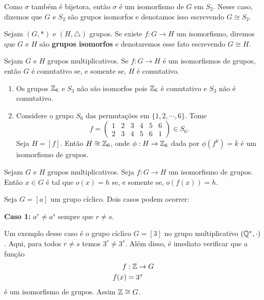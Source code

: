 \vspace{.3cm}

Como $\sigma$ também é bijetora, então $\sigma$ é um isomorfismo de $G$ em $S_2$. Nesse caso, dizemos que $G$ e $S_2$ são grupos isomorfos e denotamos isso escrevendo $G \cong S_2$.

\begin{definicao}
    Sejam $(G, *)$ e $(H, \triangle)$ grupos. Se existe $f : G \to H$ um isomorfismo, diremos que $G$ e $H$ são \textbf{grupos isomorfos} e denotaremos esse fato escrevendo $G \cong H$.
\end{definicao}

\begin{proposicao}
    Sejam $G$ e $H$ grupos multiplicativos. Se $f : G \to H$ é um isomorfismos de grupos, então $G$ é comutativo se, e somente se, $H$ é comutativo.
\end{proposicao}

\begin{exemplos}
    \begin{enumerate}[label={\arabic*})]
        \item Os grupos $\mathbb{Z}_6$ e $S_3$ não são isomorfos pois $\mathbb{Z}_6$ é comutativo e $S_3$ não é comutativo.

        \item Considere o grupo $S_6$ das permutações em $\{1, 2, \cdots, 6\}$. Tome
        \[
            f = \begin{pmatrix}
                1 & 2 & 3 & 4 & 5 & 6\\
                2 & 3 & 4 & 5 & 6 & 1
            \end{pmatrix} \in S_6.
        \]
        Seja $H = [f]$. Então $H \cong \mathbb{Z}_6$, onde $\phi : H \to \mathbb{Z}_6$ dada por $\phi(f^k) = \overline{k}$ é um isomorfismo de grupos.
    \end{enumerate}
\end{exemplos}

\begin{proposicao}
    Sejam $G$ e $H$ grupos multiplicativos. Seja $f : G \to H$ um isomorfismo de grupos. Então $x \in G$ é tal que $o(x) = h$ se, e somente se, $o(f(x)) = h$.
\end{proposicao}

Seja $G = [a]$ um grupo cíclico. Dois casos podem ocorrer:

\textbf{Caso 1:} $a^r \ne a^s$ sempre que $r \ne s$.

Um exemplo desse caso é o grupo cíclico $G = [3]$ no grupo multiplicativo $(\mathbb{Q}^*, \cdot)$. Aqui, para todos $r \ne s$ temos $3^r \ne 3^s$. Além disso, é imediato verificar que a função
\begin{align*}
    f &: \mathbb{Z} \to G\\
    f(x) &= 3^x
\end{align*}
é um isomorfismo de grupos. Assim $\mathbb{Z} \cong G$.

